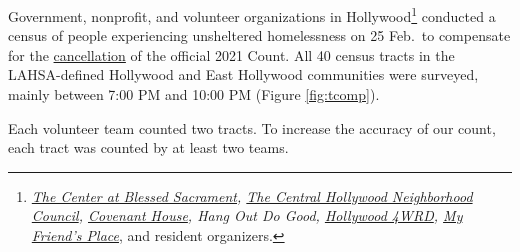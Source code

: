 \documentclass[11pt]{article}
\def\resp{respectively}
\begin{document}


 Government, nonprofit, and volunteer organizations in Hollywood\footnote{
{\it \href{https://thecenterinhollywood.org}
{The Center at Blessed Sacrament}, \href{https://chnc.org}{The Central Hollywood Neighborhood Council}, 
\href{https://www.covenanthouse.org/spring-meal-match?sourceid=2483460&origin=DHQEI2109EZI0N&utm_source=2103marchmealmatchweb&utm_medium=cpc&utm_campaign=FY21MarchMealMatch&utm_content=bsd2103marchmealmatchweb&gclid=CjwKCAiAp4KCBhB6EiwAxRxbpJA2yM7lM2tyAqjVALZgBGvjnhobCJJ0XmuELFDXzM5xxZ0BqyX1ChoCLi0QAvD_BwE}{Covenant House}, 
Hang Out Do Good, \href{https://hollywood4wrd.live}{Hollywood 4WRD}, 
 \href{https://www.myfriendsplace.org/}{My Friend's Place}}, and resident organizers.} conducted 
a census of people experiencing unsheltered homelessness on 25 Feb.~to compensate for 
the \href{https://laist.com/latest/post/20201209/LAHSA-cancels-2021-homeless-count-los-angeles-covid-19}
{cancellation} of the official 2021 Count. All 40 census tracts in the LAHSA-defined Hollywood 
and East Hollywood communities were surveyed, mainly between 7:00 PM and 10:00 PM (Figure \ref{fig:tcomp}). 

Each volunteer team counted two tracts. To increase the accuracy of our count, each tract was counted by at 
least two teams.\\
\end{document}
